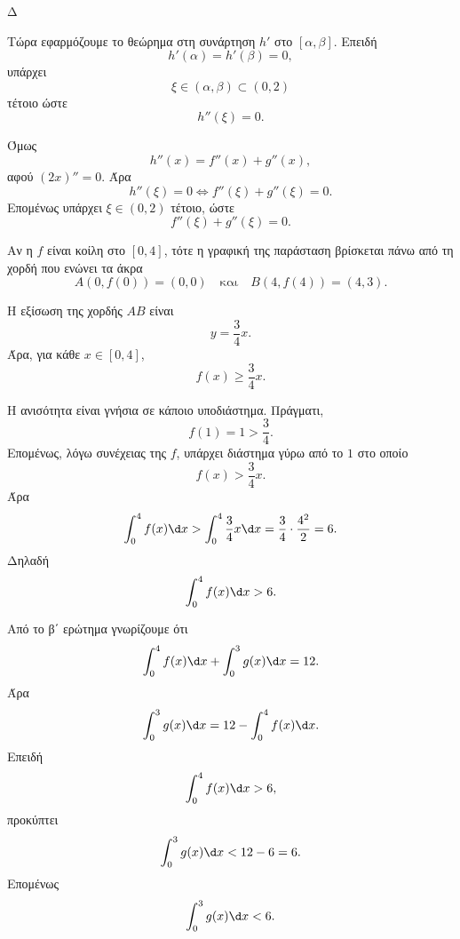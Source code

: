 \begin{thema}{Δ}
\begin{erwthma}
Τώρα εφαρμόζουμε το θεώρημα  στη συνάρτηση $h'$ στο
$[\alpha,\beta]$. Επειδή
\[
h'(\alpha)=h'(\beta)=0,
\]
υπάρχει
\[
\xi\in(\alpha,\beta)\subset(0,2)
\]
τέτοιο ώστε
\[
h''(\xi)=0.
\]

Όμως
\[
h''(x)=f''(x)+g''(x),
\]
αφού $(2x)''=0$. Άρα
\[
h''(\xi)=0
\Leftrightarrow
f''(\xi)+g''(\xi)=0.
\]
Επομένως υπάρχει $\xi\in(0,2)$ τέτοιο, ώστε
\[
{f''(\xi)+g''(\xi)=0}.
\]

\item Αν η $f$ είναι κοίλη στο $[0,4]$, τότε η γραφική της παράσταση
βρίσκεται πάνω από τη χορδή που ενώνει τα άκρα
\[
A(0,f(0))=(0,0)
\quad\text{και}\quad
B(4,f(4))=(4,3).
\]

Η εξίσωση της χορδής $AB$ είναι
\[
y=\frac34x.
\]
Άρα, για κάθε $x\in[0,4]$,
\[
f(x)\geq \frac34x.
\]

Η ανισότητα είναι γνήσια σε κάποιο υποδιάστημα. Πράγματι,
\[
f(1)=1>\frac34.
\]
Επομένως, λόγω συνέχειας της $f$, υπάρχει διάστημα γύρω από το $1$ στο
οποίο
\[
f(x)>\frac34x.
\]
Άρα
\[
\int_0^4 f(x)\d x
>
\int_0^4 \frac34x\d x
=\frac34\cdot\frac{4^2}{2}
=6.
\]
Δηλαδή
\[
{\int_0^4 f(x)\d x>6}.
\]

Από το β΄ ερώτημα γνωρίζουμε ότι
\[
\int_0^4 f(x)\d x+\int_0^3 g(x)\d x=12.
\]
Άρα
\[
\int_0^3 g(x)\d x
=12-\int_0^4 f(x)\d x.
\]
Επειδή
\[
\int_0^4 f(x)\d x>6,
\]
προκύπτει
\[
\int_0^3 g(x)\d x<12-6=6.
\]
Επομένως
\[
{\int_0^3 g(x)\d x<6}.
\]
\end{erwthma}
\end{thema}

